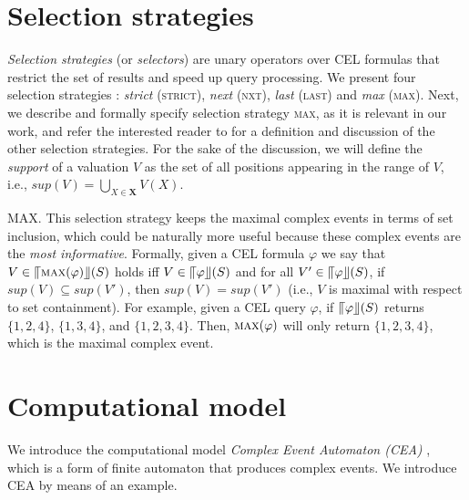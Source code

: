 \section{Selection strategies}\label{sec:selection_strategies}

\emph{Selection strategies} (or \emph{selectors}) are unary operators over CEL formulas that restrict the set of results and speed up query processing. We present four selection strategies \cite{formal-framework-cep,formal-framework-cer}: \emph{strict} (\textsc{strict}), \emph{next} (\textsc{nxt}), \emph{last} (\textsc{last}) and \emph{max} (\textsc{max}). Next, we describe and formally specify selection strategy \textsc{max}, as it is relevant in our work, and refer the interested reader to \cite{formal-framework-cer} for a definition and discussion of the other selection strategies. For the sake of the discussion, we will define the \emph{support} of a valuation $V$ as the set of all positions appearing in the range of $V$, i.e., $sup(V) = \bigcup\limits_{X \in \textbf{X}}V(X)$.

\textsc{MAX}. This selection strategy keeps the maximal complex events in terms of set inclusion, which could be naturally more useful because these complex events are the \emph{most informative}. Formally, given a CEL formula $\varphi$ we say that $V \in \llceil \textsc{max}(\varphi) \rrfloor(S)$ holds iff $V \in \llceil \varphi \rrfloor(S)$ and for all $V' \in \llceil \varphi \rrfloor(S)$, if $sup(V) \subseteq sup(V')$, then $sup(V) = sup(V')$ (i.e., $V$ is maximal with respect to set containment). For example, given a CEL query $\varphi$, if $\llceil \varphi \rrfloor(S)$ returns $\{ 1,2,4\}$, $\{1,3,4\}$, and $\{1,2,3,4\}$. Then, $\textsc{max}(\varphi)$ will only return $\{ 1, 2, 3, 4\}$, which is the maximal complex event.

\section{Computational model}\label{sec:cea}

We introduce the computational model \emph{Complex Event Automaton (CEA)} \cite{formal-framework-cep}, which is a form of finite automaton that produces complex events. We introduce CEA by means of an example.


